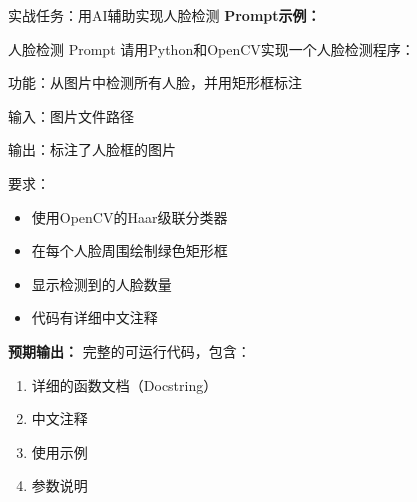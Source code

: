 
\begin{frame}[fragile]{实战任务：用AI辅助实现人脸检测}
	\textbf{Prompt示例：}

	\begin{exampleblock}{人脸检测 Prompt}
		请用Python和OpenCV实现一个人脸检测程序：

		功能：从图片中检测所有人脸，并用矩形框标注

		输入：图片文件路径

		输出：标注了人脸框的图片

		要求：
		\begin{itemize}
			\item 使用OpenCV的Haar级联分类器
			\item 在每个人脸周围绘制绿色矩形框
			\item 显示检测到的人脸数量
			\item 代码有详细中文注释
		\end{itemize}
	\end{exampleblock}

	\vspace{0.3cm}

	\textbf{预期输出：} 完整的可运行代码，包含：
	\begin{enumerate}
		\item 详细的函数文档（Docstring）
		\item 中文注释
		\item 使用示例
		\item 参数说明
	\end{enumerate}
\end{frame}

